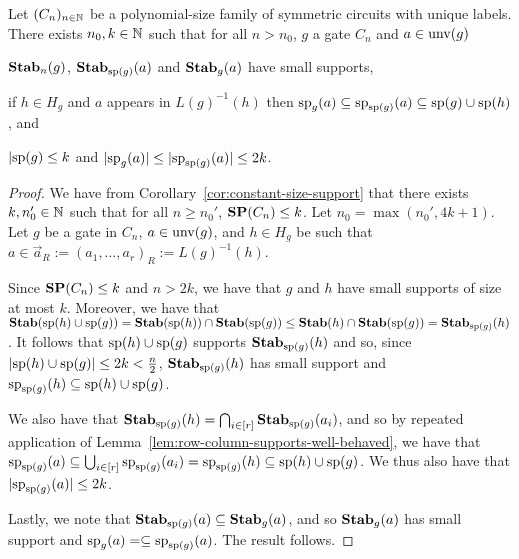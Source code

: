 \documentclass[../main/thesis.tex]{subfiles}
\begin{document}
\begin{lem}
  \label{lem:row-column-supports}
  Let $(C_n)_{n \in \mathbb{N}}$ be a polynomial-size family of symmetric circuits
  with unique labels. There exists $n_0, k \in \mathbb{N}$ such that for all $n >
  n_0$, $g$ a gate $C_n$ and $a \in \text{unv}(g)$
  \begin{myitemize}
  \item $\text{\textbf{Stab}}_n(g)$, $\text{\textbf{Stab}}_{\text{sp}(g)}(a)$ and $\text{\textbf{Stab}}_{g}(a)$ have small
    supports,
  \item if $h \in H_g$ and $a$ appears in $L(g)^{-1}(h)$ then $\text{sp}_g(a)
    \subseteq \text{sp}_{\text{sp}(g)}(a) \subseteq \text{sp}(g) \cup \text{sp}(h)$, and
  \item $\vert \text{sp}(g) \leq k$ and $\vert \text{sp}_g(a) \vert \leq \vert
    \text{sp}_{\text{sp}(g)}(a) \vert \leq 2k$.
  \end{myitemize}
\end{lem}

\begin{proof}
  We have from Corollary~\ref{cor:constant-size-support} that there exists $k,
  n_0' \in \mathbb{N}$ such that for all $n \geq n_0'$, $\text{\textbf{SP}}(C_n) \leq k$. Let $n_0 =
  \max(n_0', 4k + 1)$. Let $g$ be a gate in $C_n$, $a \in \text{unv}(g)$, and $h
  \in H_g$ be such that $a \in \vec{a}_R := (a_1, \ldots , a_r)_R :=
  L(g)^{-1}(h)$.

  Since $\text{\textbf{SP}}(C_n) \leq k$ and $n > 2k$, we have that $g$ and $h$ have small
  supports of size at most $k$. Moreover, we have that $\text{\textbf{Stab}}(\text{sp}(h) \cup
  \text{sp}(g)) = \text{\textbf{Stab}}(\text{sp}(h)) \cap \text{\textbf{Stab}}(\text{sp}(g)) \leq \text{\textbf{Stab}}(h) \cap
  \text{\textbf{Stab}} (\text{sp} (g)) = \text{\textbf{Stab}}_{\text{sp}(g)}(h)$. It follows that $\text{sp}(h) \cup \text{sp}(g)$
  supports $\text{\textbf{Stab}}_{\text{sp}(g)}(h)$ and so, since $\vert \text{sp}(h) \cup \text{sp}(g)
  \vert \leq 2k < \frac{n}{2}$, $\text{\textbf{Stab}}_{\text{sp}(g)}(h)$ has small support and
  $\text{sp}_{\text{sp}(g)}(h) \subseteq \text{sp}(h) \cup \text{sp}(g)$.

  We also have that $\text{\textbf{Stab}}_{\text{sp}(g)}(h) = \bigcap_{i \in
    [r]}\text{\textbf{Stab}}_{\text{sp}(g)}(a_i)$, and so by repeated application of
  Lemma~\ref{lem:row-column-supports-well-behaved}, we have that
  $\text{sp}_{\text{sp}(g)}(a) \subseteq \bigcup_{i \in [r]}\text{sp}_{\text{sp}(g)}(a_i) =
  \text{sp}_{\text{sp}(g)}(h) \subseteq \text{sp}(h) \cup \text{sp}(g)$. We thus also have
  that $\vert \text{sp}_{\text{sp}(g)}(a) \vert \leq 2k$.

  Lastly, we note that $\text{\textbf{Stab}}_{\text{sp}(g)}(a) \subseteq \text{\textbf{Stab}}_g(a)$, and so
  $\text{\textbf{Stab}}_g(a)$ has small support and $\text{sp}_g(a) = \subseteq
  \text{sp}_{\text{sp}(g)}(a)$. The result follows.
\end{proof}
\end{document}
